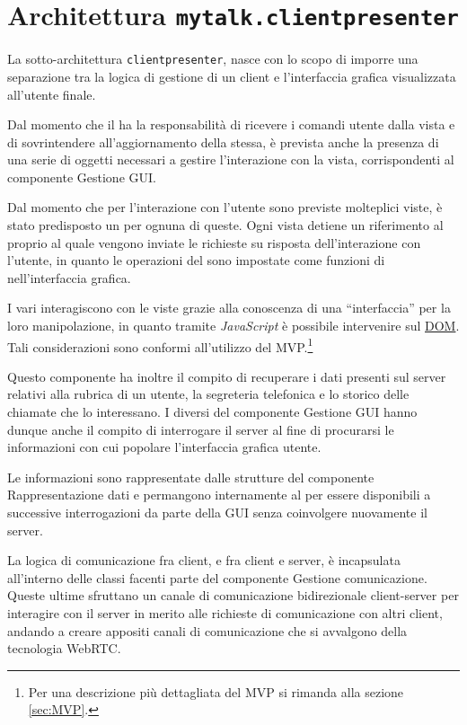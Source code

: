 \section{Architettura \texttt{mytalk.clientpresenter}}\label{sec:clientpresenter}
La sotto-architettura \texttt{clientpresenter}, nasce con lo scopo di imporre una separazione tra la logica di gestione di un client e l'interfaccia grafica visualizzata all'utente finale.

Dal momento che il  ha la responsabilità di ricevere i comandi utente dalla vista e di sovrintendere all'aggiornamento della stessa, è prevista anche la presenza di una serie di oggetti necessari a gestire l'interazione con la vista, corrispondenti al componente \textsf{Gestione GUI}\@.

Dal momento che per l'interazione con l'utente sono previste molteplici viste, è stato predisposto un  per ognuna di queste. Ogni vista detiene un riferimento al proprio  al quale vengono inviate le richieste su risposta dell'interazione con l'utente, in quanto le operazioni del  sono impostate come funzioni di  nell'interfaccia grafica.

I vari  interagiscono con le viste grazie alla conoscenza di una ``interfaccia'' per la loro manipolazione, in quanto tramite \textit{JavaScript} è possibile intervenire sul \underline{DOM}\@. Tali considerazioni sono conformi all'utilizzo del  MVP.\footnote{%
  Per una descrizione più dettagliata del  MVP si rimanda alla sezione \ref{sec:MVP}\@.
}

Questo componente ha inoltre il compito di recuperare i dati presenti sul server relativi alla rubrica di un utente, la segreteria telefonica e lo storico delle chiamate che lo interessano. I diversi  del componente \textsf{Gestione GUI} hanno dunque anche il compito di interrogare il server al fine di procurarsi le informazioni con cui popolare l'interfaccia grafica utente.

Le informazioni sono rappresentate dalle strutture del componente \textsf{Rappresentazione dati} e permangono internamente al  per essere disponibili a successive interrogazioni da parte della GUI senza coinvolgere nuovamente il server.

La logica di comunicazione fra client, e fra client e server, è incapsulata all'interno delle classi facenti parte del componente \textsf{Gestione comunicazione}. Queste ultime sfruttano un canale di comunicazione bidirezionale client-server per interagire con il server in merito alle richieste di comunicazione con altri client, andando a creare appositi canali di comunicazione che si avvalgono della tecnologia WebRTC\@.

